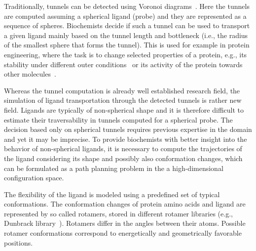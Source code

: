 \documentclass{svmult}
\begin{document}
Traditionally, tunnels can be detected using Voronoi diagrams~\cite{yaffe2008,caver3}.
Here the tunnels are computed assuming a spherical ligand (probe) and they are represented as a sequence of spheres.
Biochemists decide if such a tunnel can be used to transport a given ligand mainly based on the tunnel length and bottleneck (i.e., the radius of the smallest sphere that forms the tunnel).
This is used for example in protein engineering, where the task is to change selected properties of a protein, e.g., its stability under different outer conditions~\cite{Koudelakova2013} or its activity of the protein towards other molecules~\cite{Pavlova2009}.

Whereas the tunnel computation is already well established research field, the simulation of ligand transportation through the detected tunnels is rather new field.
Ligands are typically of non-spherical shape and it is therefore difficult to estimate their traversability in tunnels computed for a spherical probe.
The decision based only on spherical tunnels requires previous expertise in the domain and yet it may be imprecise.
To provide biochemists with better insight into the behavior of non-spherical ligands, it is necessary to compute the trajectories of the ligand considering its shape and possibly also conformation changes, which can be formulated as a path planning problem in the a high-dimensional configuration space.

The flexibility of the ligand is modeled using a predefined set of typical conformations.
The conformation changes of protein amino acids and ligand are represented by so called rotamers, stored in different rotamer libraries (e.g., Dunbrack library~\cite{dunbrack}).
Rotamers differ in the angles between their atoms.
Possible rotamer conformations correspond to energetically and geometrically favorable positions.
\end{document}
